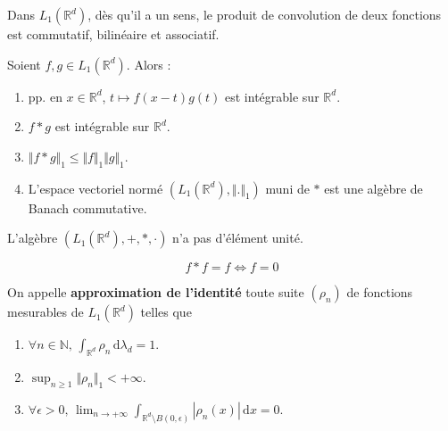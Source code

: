   \begin{proposition}
    Dans $L_1(\mathbb{R}^d)$, dès qu'il a un sens, le produit de convolution de deux fonctions est commutatif, bilinéaire et associatif.
  \end{proposition}

  \begin{theorem}
    Soient $f, g \in L_1(\mathbb{R}^d)$. Alors :
    \begin{enumerate}[label={\bfseries(\roman*)}]
      \item pp. en $x \in \mathbb{R}^d$, $t \mapsto f(x-t)g(t)$ est intégrable sur $\mathbb{R}^d$.
      \item $f * g$ est intégrable sur $\mathbb{R}^d$.
      \item $\Vert f * g \Vert_1 \leq \Vert f \Vert_1 \Vert g \Vert_1$.
      \item L'espace vectoriel normé $(L_1(\mathbb{R}^d), \Vert . \Vert_1)$ muni de $*$ est une algèbre de Banach commutative.
    \end{enumerate}
  \end{theorem}


  \begin{proposition}
    L'algèbre $(L_1(\mathbb{R}^d), +, *, \cdot)$ n'a pas d'élément unité.
  \end{proposition}

  \begin{application}
    \[ f * f = f \iff f = 0 \]
  \end{application}


  \begin{definition}
    On appelle \textbf{approximation de l'identité} toute suite $(\rho_n)$ de fonctions mesurables de $L_1(\mathbb{R}^d)$ telles que
    \begin{enumerate}[label={\bfseries(\roman*)}]
      \item $\forall n \in \mathbb{N}, \, \int_{\mathbb{R}^d} \rho_n \, \mathrm{d}\lambda_d = 1$.
      \item $\sup_{n \geq 1} \Vert \rho_n \Vert_1 < +\infty$.
      \item $\forall \epsilon > 0, \, \lim_{n \rightarrow +\infty} \int_{\mathbb{R}^d \setminus B(0, \epsilon)} |\rho_n(x)| \, \mathrm{d}x = 0$.
    \end{enumerate}
  \end{definition}

